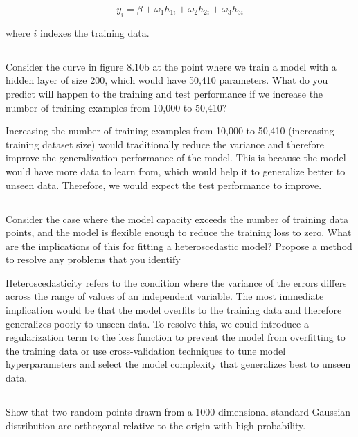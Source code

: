 \documentclass[12pt]{report}
\begin{document}
\begin{equation*}
    y_{i} = \beta + \omega_{1}h_{1i} + \omega_{2}h_{2i} + \omega_{3}h_{3i}
\end{equation*}

where $i$ indexes the training data.

\subsection{}
\begin{mdframed}
    Consider the curve in figure 8.10b at the point where we train a model with a hidden layer of size 200, which would have 50,410 parameters. What do you predict will happen to the training and test performance if we increase the number of training examples from 10,000 to 50,410?
\end{mdframed}

Increasing the number of training examples from 10,000 to 50,410 (increasing training dataset size) would traditionally reduce the variance and therefore improve the generalization performance of the model. This is because the model would have more data to learn from, which would help it to generalize better to unseen data. Therefore, we would expect the test performance to improve.

\subsection{}
\begin{mdframed}
    Consider the case where the model capacity exceeds the number of training data points, and the model is flexible enough to reduce the training loss to zero. What are the implications of this for fitting a heteroscedastic model? Propose a method to resolve any problems that you identify
\end{mdframed}

Heteroscedasticity refers to the condition where the variance of the errors differs across the range of values of an independent variable. The most immediate implication would be that the model overfits to the training data and therefore generalizes poorly to unseen data. To resolve this, we could introduce a regularization term to the loss function to prevent the model from overfitting to the training data or use cross-validation techniques to tune model hyperparameters and select the model complexity that generalizes best to unseen data.

\subsection{}
\begin{mdframed}
    Show that two random points drawn from a 1000-dimensional standard Gaussian distribution are orthogonal relative to the origin with high probability.
\end{mdframed}
\end{document}
